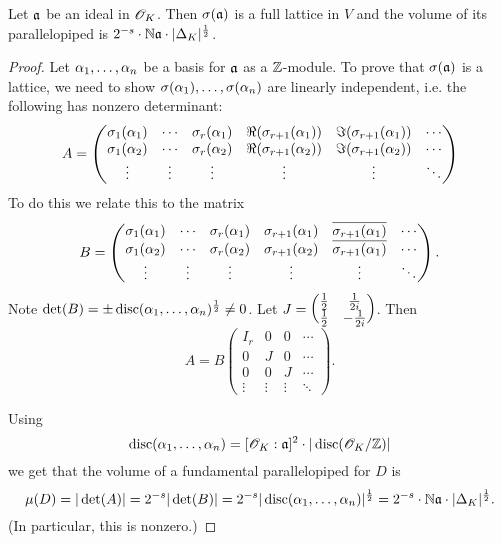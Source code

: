 \begin{pr}
Let $\mathfrak{a}$ be an ideal in $\mathscr{O}_K$. Then $\sigma(\mathfrak{a})$ is a full lattice in $V$ and the volume of its parallelopiped is 
$2^{-s}\cdot\mathbb{N}  \mathfrak{a} \cdot |\Delta_K|^{\frac{1}{2}}$.
\end{pr}
\begin{proof}
Let $\alpha_1,\ldots, \alpha_n$ be a basis for $\mathfrak{a}$ as a $\mathbb{Z}$-module. To prove that $\sigma(\mathfrak{a})$ is a lattice, we need to show $\sigma(\alpha_1),\ldots, \sigma(\alpha_n)$ are linearly independent, i.e. the following has nonzero determinant:
\[
A=\begin{pmatrix}
\sigma_1(\alpha_1) & \cdots & \sigma_r(\alpha_1) & \Re(\sigma_{r+1}(\alpha_1)) & \Im(\sigma_{r+1}(\alpha_1)) & \cdots\\
\sigma_1(\alpha_2) & \cdots & \sigma_r(\alpha_2) & \Re(\sigma_{r+1}(\alpha_2)) & \Im(\sigma_{r+1}(\alpha_2)) & \cdots\\
\vdots &\vdots &\vdots &\vdots &\vdots &\ddots
\end{pmatrix}
\]
To do this we relate this to the matrix
\[
B=\begin{pmatrix}
\sigma_1(\alpha_1) & \cdots & \sigma_r(\alpha_1) & \sigma_{r+1}(\alpha_1) & \overline{\sigma_{r+1}(\alpha_1)} & \cdots\\
\sigma_1(\alpha_2) & \cdots & \sigma_r(\alpha_2) & \sigma_{r+1}(\alpha_2) & \overline{\sigma_{r+1}(\alpha_1)} & \cdots\\
\vdots &\vdots &\vdots &\vdots &\vdots &\ddots
\end{pmatrix}.
\]
Note $\det(B)=\pm \operatorname{disc}(\alpha_1,\ldots, \alpha_n)^{\frac{1}{2}}\ne 0$. 
Let $J=%
\matt{\rc2}{\rc{2i}}{\rc2}{-\rc{2i}}$. Then
\[
A=B\begin{pmatrix}I_r & 0& 0& \cdots\\ 0 & J & 0 & \cdots\\ 0 & 0 & J &\cdots \\ \vdots & \vdots & \vdots &\ddots\end{pmatrix}.
\]

Using
\[
\operatorname{disc}(\alpha_1,\ldots, \alpha_n)=[\mathscr{O}_K:\mathfrak{a}]^2\cdot |\operatorname{disc}(\mathscr{O}_K/\mathbb{Z})|
\]
we get that the volume of a fundamental parallelopiped for $D$ is
\[
\mu(D)=|\det(A)|=2^{-s}|\det(B)|=2^{-s}|\operatorname{disc}(\alpha_1,\ldots, \alpha_n)|^{\frac{1}{2}}=2^{-s}\cdot \mathbb{N} \mathfrak{a} \cdot |\Delta_K|^{\frac{1}{2}}.
\]
(In particular, this is nonzero.)
\end{proof}

